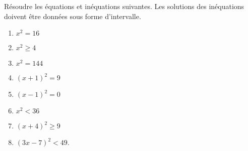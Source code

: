 
\begin{exercice}\label{exosmath-0177}

Résoudre les équations et inéquations suivantes. Les solutions des inéquations doivent être données sous forme d'intervalle.
\begin{multicols}{2}
    \begin{enumerate}
        \item
            \( x^2=16\)
        \item
            \( x^2\geq 4\)
        \item
            \( x^2=144\)
        \item
            \( (x+1)^2=9\)
        \item
            \( (x-1)^2=0\)
        \item
            \( x^2 <36\)
        \item
            \( (x+4)^2\geq 9\)
        \item
            \( (3x-7)^2<49\).
    \end{enumerate}
\end{multicols}

\end{exercice}
